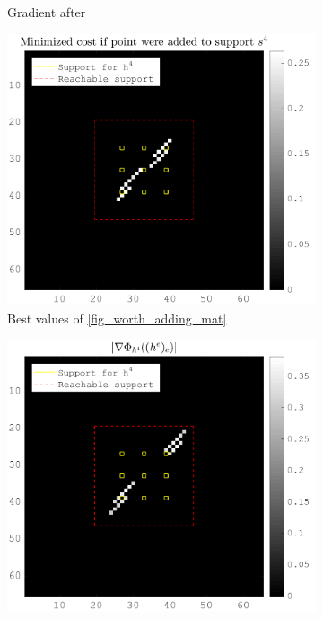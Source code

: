 \begin{figure}[!h]
\begin{subfigure}[b]{0.32\textwidth}
\caption{Gradient after} \label{fig_grad_after}
\end{subfigure}
\begin{subfigure}[b]{0.32\textwidth}\centering
\includegraphics[width=\textwidth]{figures/before_after/xp_128x128_sc2_angl1_K3_S3_node4before_objmatrix_bestvalues.png}
\caption{Best values of \ref{fig_worth_adding_mat}}
\end{subfigure}
\begin{subfigure}[b]{0.32\textwidth}\centering
\includegraphics[width=\textwidth]{figures/before_after/xp_128x128_sc2_angl1_K3_S3_node4before_partgrad4_bestvalues.png}

\end{subfigure}
\end{figure}
